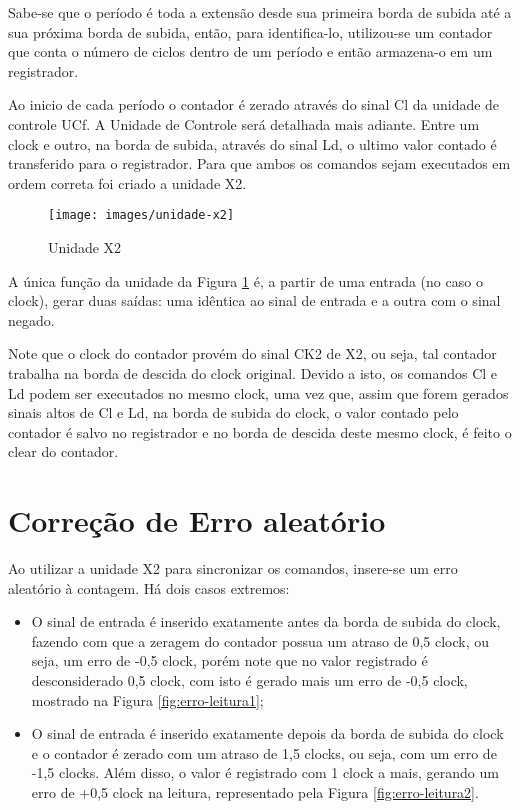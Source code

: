 \documentclass[12pt,a4paper,openany]{abntex2}
\begin{document}
Sabe-se que o período é toda a extensão desde sua primeira
borda de subida até a sua próxima borda de subida, então, para identifica-lo, utilizou-se um contador que conta o número de ciclos dentro de um período e então armazena-o em um registrador.

Ao inicio de cada período o contador é zerado através do sinal Cl da unidade de controle UCf. A Unidade de Controle será detalhada mais adiante. Entre um clock e outro, na borda de subida, através do sinal Ld, o ultimo valor contado é transferido para o registrador. Para que ambos os comandos sejam executados em ordem correta foi criado a unidade X2.

\begin{figure}[!htp]
	\centering
	\caption{Unidade X2}
	\texttt{[image: images/unidade-x2]}
	\label{fig:unidade-x2}
\end{figure}

A única função da unidade da Figura \ref{fig:unidade-x2} é, a partir de uma entrada (no caso o clock), gerar duas saídas: uma idêntica ao sinal de entrada e a outra com o sinal negado.

Note que o clock do contador provém do sinal CK2 de X2, ou seja, tal contador trabalha na borda de descida do clock original. Devido a isto, os comandos Cl e Ld podem ser executados no mesmo clock, uma vez que, assim que forem gerados sinais altos de Cl e Ld, na borda de subida do clock, o valor contado pelo contador é salvo no registrador e no borda de descida deste mesmo clock, é feito o clear do contador.

\section{Correção de Erro aleatório}

Ao utilizar a unidade X2 para sincronizar os comandos, insere-se um erro aleatório à contagem. Há dois casos extremos:

\begin{itemize}	
	\item O sinal de entrada é inserido exatamente antes da borda de subida do clock, fazendo com que a zeragem do contador possua um atraso de 0,5 clock, ou seja, um erro de -0,5 clock, porém note que no valor registrado é desconsiderado 0,5 clock, com isto é gerado mais um erro de -0,5 clock, mostrado na Figura \ref{fig:erro-leitura1};
\end{itemize}


\begin{itemize}	
	\item O sinal de entrada é inserido exatamente depois da borda de subida do clock e o contador é zerado com um atraso de 1,5 clocks, ou seja, com um erro de -1,5 clocks. Além disso, o valor é registrado com 1 clock a mais, gerando um erro de +0,5 clock na leitura, representado pela Figura \ref{fig:erro-leitura2}.
\end{itemize}
\end{document}
